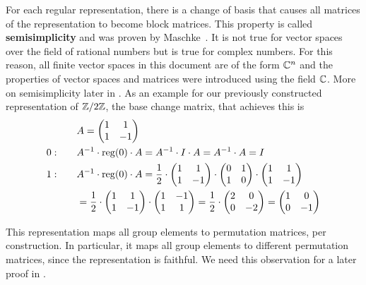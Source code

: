 For each regular representation, there is a change of basis that causes all matrices of the representation to become block matrices.
This property is called \textbf{semisimplicity} and was proven by Maschke~\cite{maschke1899}.
It is not true for vector spaces over the field of rational numbers but is true for complex numbers.
For this reason, all finite vector spaces in this document are of the form $\mathbb{C}^n$ and the properties of vector spaces and matrices were introduced using the field $\mathbb{C}$.
More on semisimplicity later in .
As an example for our previously constructed representation of $\mathbb{Z}/2\mathbb{Z}$, the base change matrix, that achieves this is
\begin{align*}
    & A = \begin{pmatrix}
        1 & 1 \\
        1 & -1
    \end{pmatrix} \\
    0: \qquad & A^{-1} \cdot \operatorname{reg}(0) \cdot A = A^{-1} \cdot I \cdot A = A^{-1} \cdot A = I \\
    1: \qquad & A^{-1} \cdot \operatorname{reg}(0) \cdot A = \frac{1}{2} \cdot \begin{pmatrix}
        1 & 1 \\
        1 & -1
    \end{pmatrix} \cdot \begin{pmatrix}
        0 & 1 \\
        1 & 0
    \end{pmatrix} \cdot \begin{pmatrix}
        1 & 1 \\
        1 & -1
    \end{pmatrix} \\
    & = \frac{1}{2} \cdot \begin{pmatrix}
        1 & 1 \\
        1 & -1
    \end{pmatrix} \cdot \begin{pmatrix}
        1 & -1 \\
        1 & 1
    \end{pmatrix} = \frac{1}{2} \cdot \begin{pmatrix}
        2 & 0 \\
        0 & -2
    \end{pmatrix} = \begin{pmatrix}
        1 & 0 \\
        0 & -1
    \end{pmatrix}
\end{align*}

This representation maps all group elements to permutation matrices, per construction.
In particular, it maps all group elements to different permutation matrices, since the representation is faithful.
We need this observation for a later proof in .
